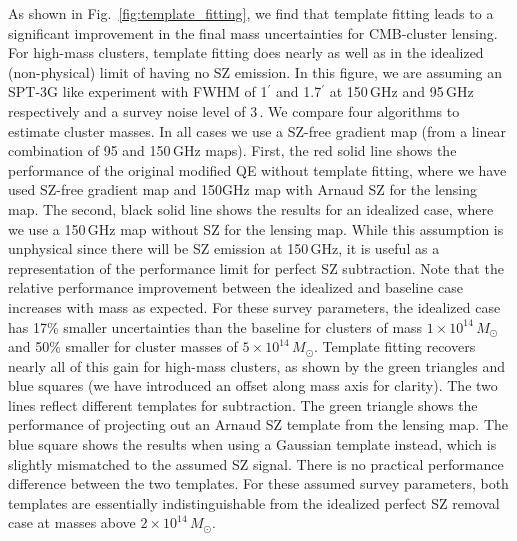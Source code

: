 As shown in Fig.~\ref{fig:template_fitting}, we find that template fitting leads to a significant improvement in the final mass uncertainties for CMB-cluster lensing. 
For high-mass clusters, template fitting does nearly as well as in the idealized (non-physical) limit of having no SZ emission. 
In this figure, we are assuming an SPT-3G like experiment with FWHM of 1$^\prime$ and 1.7$^\prime$ at 150\,GHz and  95\,GHz respectively and a survey noise level of 3\,\ukarcmin{}. 
We compare four algorithms to estimate cluster masses. 
In all cases we use a SZ-free gradient map (from a linear combination of 95 and 150\,GHz maps). 
First, the red solid line shows the performance of the original modified QE without template fitting, where we have used SZ-free gradient map and 150GHz map with Arnaud SZ for the lensing map. 
The second, black solid line shows the results for an idealized case, where we use a 150\,GHz map without SZ for the lensing map. 
While this assumption is unphysical since there will be SZ emission at 150\,GHz, it is useful as a representation of the performance limit for perfect SZ subtraction. 
Note that the relative performance improvement between the idealized and baseline case increases with mass as expected. 
For these survey parameters, the idealized case has 17\% smaller uncertainties than the baseline for clusters of mass $1\times 10^{14}\,M_{\odot}$ and 50\% smaller for cluster masses of $5\times 10^{14}\,M_{\odot}$. 
Template fitting recovers nearly all of this gain for high-mass clusters, as shown by the green triangles and blue squares (we have introduced an offset along mass axis for clarity). 
The two lines reflect different templates for subtraction. 
The green triangle shows the performance of projecting out an Arnaud SZ template from the lensing map. 
The blue square shows the results when using a Gaussian template instead, which is slightly mismatched to the assumed SZ signal. 
There is no practical performance difference between the two templates. 
For these assumed survey parameters, both templates are essentially indistinguishable from the idealized perfect SZ removal case at masses above $2\times 10^{14}\,M_{\odot}$. 

